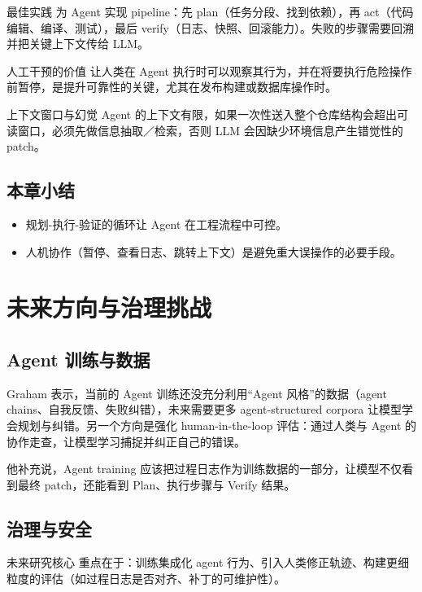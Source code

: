 \documentclass[a4paper]{article}
\begin{document}
\begin{importantbox}{最佳实践}
为 Agent 实现 pipeline：先 plan（任务分段、找到依赖），再 act（代码编辑、编译、测试），最后 verify（日志、快照、回滚能力）。失败的步骤需要回溯并把关键上下文传给 LLM。
\end{importantbox}

\begin{knowledgebox}{人工干预的价值}
让人类在 Agent 执行时可以观察其行为，并在将要执行危险操作前暂停，是提升可靠性的关键，尤其在发布构建或数据库操作时。
\end{knowledgebox}

\begin{warningbox}{上下文窗口与幻觉}
Agent 的上下文有限，如果一次性送入整个仓库结构会超出可读窗口，必须先做信息抽取／检索，否则 LLM 会因缺少环境信息产生错觉性的 patch。
\end{warningbox}

\subsection{本章小结}
\begin{itemize}
    \item 规划-执行-验证的循环让 Agent 在工程流程中可控。
    \item 人机协作（暂停、查看日志、跳转上下文）是避免重大误操作的必要手段。
\end{itemize}

\section{未来方向与治理挑战}
\subsection{Agent 训练与数据}
Graham 表示，当前的 Agent 训练还没充分利用“Agent 风格”的数据（agent chains、自我反馈、失败纠错），未来需要更多 agent-structured corpora 让模型学会规划与纠错。另一个方向是强化 human-in-the-loop 评估：通过人类与 Agent 的协作走查，让模型学习捕捉并纠正自己的错误。

他补充说，Agent training 应该把过程日志作为训练数据的一部分，让模型不仅看到最终 patch，还能看到 Plan、执行步骤与 Verify 结果。

\subsection{治理与安全}
\begin{knowledgebox}{未来研究核心}
重点在于：训练集成化 agent 行为、引入人类修正轨迹、构建更细粒度的评估（如过程日志是否对齐、补丁的可维护性）。
\end{knowledgebox}
\end{document}
